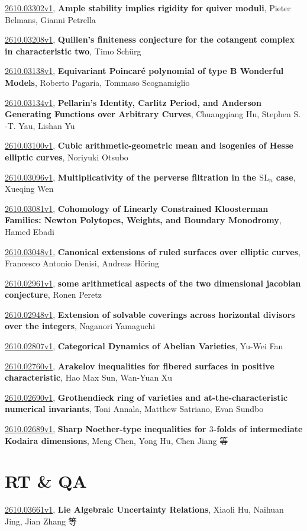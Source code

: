 \documentclass[9pt, a4paper]{article}
\theoremstyle{plain}
\theoremstyle{definition}
\theoremstyle{remark}
\newcommand{\arxiv}[3]{\href{https://arxiv.org/abs/#1}{#1}, \textbf{\textcolor{arxivblue}{#2}}, #3}
\begin{document}
\arxiv{2610.03302v1}{Ample stability implies rigidity for quiver moduli}{Pieter Belmans, Gianni Petrella}

\arxiv{2610.03208v1}{Quillen's finiteness conjecture for the cotangent complex in characteristic two}{Timo Schürg}

\arxiv{2610.03138v1}{Equivariant Poincaré polynomial of type B Wonderful Models}{Roberto Pagaria, Tommaso Scognamiglio}

\arxiv{2610.03134v1}{Pellarin's Identity, Carlitz Period, and Anderson Generating Functions over Arbitrary Curves}{Chuangqiang Hu, Stephen S. -T. Yau, Lishan Yu}

\arxiv{2610.03100v1}{Cubic arithmetic-geometric mean and isogenies of Hesse elliptic curves}{Noriyuki Otsubo}

\arxiv{2610.03096v1}{Multiplicativity of the perverse filtration in the $\mathrm{SL}_n$ case}{Xueqing Wen}

\arxiv{2610.03081v1}{Cohomology of Linearly Constrained Kloosterman Families: Newton Polytopes, Weights, and Boundary Monodromy}{Hamed Ebadi}

\arxiv{2610.03048v1}{Canonical extensions of ruled surfaces over elliptic curves}{Francesco Antonio Denisi, Andreas Höring}

\arxiv{2610.02961v1}{some arithmetical aspects of the two dimensional jacobian conjecture}{Ronen Peretz}

\arxiv{2610.02948v1}{Extension of solvable coverings across horizontal divisors over the integers}{Naganori Yamaguchi}

\arxiv{2610.02807v1}{Categorical Dynamics of Abelian Varieties}{Yu-Wei Fan}

\arxiv{2610.02760v1}{Arakelov inequalities for fibered surfaces in positive characteristic}{Hao Max Sun, Wan-Yuan Xu}

\arxiv{2610.02690v1}{Grothendieck ring of varieties and at-the-characteristic numerical invariants}{Toni Annala, Matthew Satriano, Evan Sundbo}

\arxiv{2610.02689v1}{Sharp Noether-type inequalities for $3$-folds of intermediate Kodaira dimensions}{Meng Chen, Yong Hu, Chen Jiang 等}


\section{RT \& QA}
\arxiv{2610.03661v1}{Lie Algebraic Uncertainty Relations}{Xiaoli Hu, Naihuan Jing, Jian Zhang 等}
\end{document}

